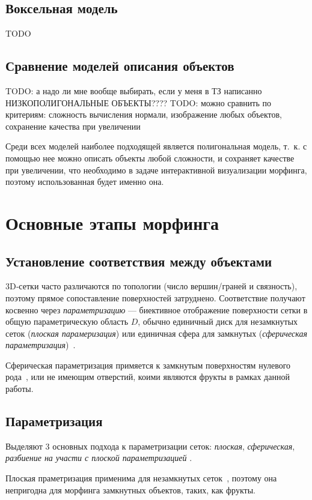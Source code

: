 \subsection{Воксельная модель}
TODO

\subsection{Сравнение моделей описания объектов}
TODO: а надо ли мне вообще выбирать, если у меня в ТЗ написанно НИЗКОПОЛИГОНАЛЬНЫЕ ОБЪЕКТЫ????
TODO: можно сравнить по критериям: сложность вычисления нормали, изображение любых объектов, сохранение качества при увеличении

Среди всех моделей наиболее подходящей является полигональная модель, т.~к. с помощью нее можно описать объекты любой сложности, и сохраняет качестве при увеличении, что необходимо в задаче интерактивной визуализации морфинга,  поэтому использованная будет именно она.

\section{Основные этапы морфинга} 
    \subsection{Установление соответствия между объектами}
	3D‑сетки часто различаются по топологии (число вершин/граней и связность), поэтому прямое сопоставление поверхностей затруднено. Соответствие получают косвенно через \textit{параметризацию} — биективное отображение поверхности сетки в общую параметрическую область $D$, обычно единичный диск для незамкнутых сеток (\textit{плоская парамеризация}) или единичная сфера для замкнутых (\textit{сферическая параметризация})~\cite{mocanu}.
	
	Сферическая параметризация примяется к замкнутым поверхностям нулевого рода~\cite{mocanu}, или не имеющим отверстий, коими являются фрукты в рамках данной работы.
    
    \subsection{Параметризация}
    
    Выделяют 3 основных подхода к параметризации сеток: \textit{плоская}, \textit{сферическая}, \textit{разбиение на участи с плоской параметризацией} \cite{mocanu,alexa}.
    
    Плоская праметризация применима для незамкнутых сеток~\cite{mocanu,alexa}, поэтому она непригодна для морфинга замкнутных объектов, таких, как фрукты.
    
